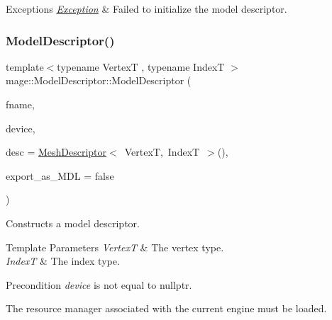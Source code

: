 \begin{DoxyExceptions}{Exceptions}
{\em \hyperlink{classmage_1_1_exception}{Exception}} & Failed to initialize the model descriptor. \\
\hline
\end{DoxyExceptions}
\hypertarget{classmage_1_1_model_descriptor_ad4c12dadb852eb4f9541b1b4addad5e9}{}\label{classmage_1_1_model_descriptor_ad4c12dadb852eb4f9541b1b4addad5e9} 
\subsubsection{\texorpdfstring{Model\+Descriptor()}{ModelDescriptor()}\hspace{0.1cm}{\footnotesize\ttfamily [2/4]}}
{\footnotesize\ttfamily template$<$typename VertexT , typename IndexT $>$ \\
mage\+::\+Model\+Descriptor\+::\+Model\+Descriptor (\begin{DoxyParamCaption}\item[{wstring}]{fname,  }\item[{I\+D3\+D11\+Device5 $\ast$}]{device,  }\item[{const \hyperlink{structmage_1_1_mesh_descriptor}{Mesh\+Descriptor}$<$ VertexT, IndexT $>$ \&}]{desc = {\ttfamily \hyperlink{structmage_1_1_mesh_descriptor}{Mesh\+Descriptor}$<$~VertexT,~IndexT~$>$()},  }\item[{bool}]{export\+\_\+as\+\_\+\+M\+DL = {\ttfamily false} }\end{DoxyParamCaption})\hspace{0.3cm}{\ttfamily [explicit]}}

Constructs a model descriptor.


\begin{DoxyTemplParams}{Template Parameters}
{\em VertexT} & The vertex type. \\
\hline
{\em IndexT} & The index type. \\
\hline
\end{DoxyTemplParams}
\begin{DoxyPrecond}{Precondition}
{\itshape device} is not equal to {\ttfamily nullptr}. 

The resource manager associated with the current engine must be loaded. 
\end{DoxyPrecond}

